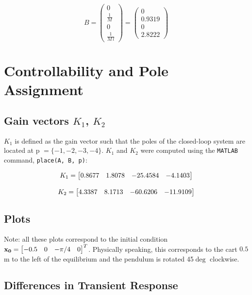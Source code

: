 \documentclass[10pt]{article}
\begin{document}
\begin{equation*}
    B = \left(\begin{array}{c} 0\\ \frac{1}{M}\\ 0\\ \frac{1}{M\,l} \end{array}\right) = \left(\begin{array}{c} 0\\ 0.9319\\ 0\\ 2.8222 \end{array}\right)
\end{equation*}

\section{Controllability and Pole Assignment}

\subsection{Gain vectors $K_1$, $K_2$}
$K_1$ is defined as the gain vector such that the poles of the closed-loop system are located at p $ =\{-1, -2, -3, -4\}$. $K_1$ and $K_2$ were computed using the \texttt{MATLAB} command, \texttt{place(A, B, p)}:

\begin{equation*}
    K_1 = \begin{bmatrix} 0.8677 & 1.8078 & -25.4584 & -4.1403 \end{bmatrix}
\end{equation*}

\begin{equation*}
    K_2 = \begin{bmatrix} 4.3387  &  8.1713 & -60.6206 & -11.9109 \end{bmatrix}
\end{equation*}

\subsection{Plots}
Note: all these plots correspond to the initial condition $\mathbf{x_0} = \begin{bmatrix}  -0.5 & 0 & -\pi/4 & 0 \end{bmatrix}^T$. Physically speaking, this corresponds to the cart $0.5$m to the left of the equilibrium and the pendulum is rotated 45$\deg$ clockwise.  
\subsection{Differences in Transient Response}
\subsection{}
\end{document}
